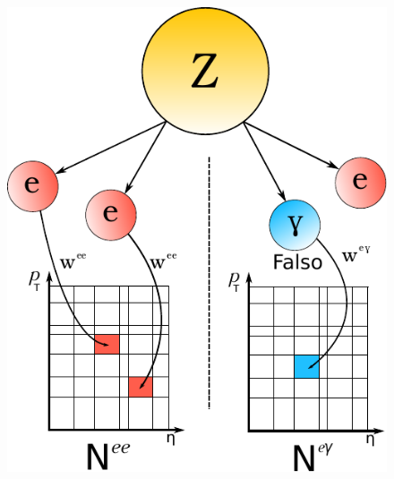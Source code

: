 \documentclass[10pt, compress,spanish]{beamer}
\begin{document}
\begin{frame}[fragile]
\begin{columns}
\begin{column}{0.5\textwidth}
\begin{figure}
\includegraphics[width=1\textwidth]{grid.pdf}
\end{figure}


\end{column}

\end{columns}





\end{frame}

\end{document}
